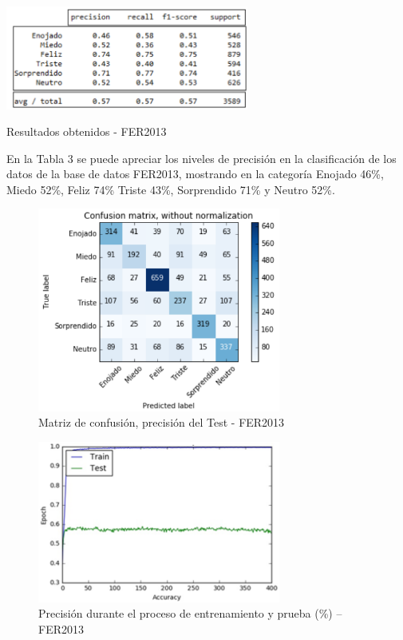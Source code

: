 \begin{table}[H]
    \centering
    \includegraphics[width=80mm]{./Imagenes/tabla_resultados_fer.png} 
    \caption{Resultados obtenidos - FER2013}
    \label{tab:tabla_resultados_fer}
\end{table}

En la Tabla 3 se puede apreciar los niveles de precisión en la clasificación de los
datos de la base de datos FER2013, mostrando en la categoría Enojado 46\%, Miedo 52\%,
Feliz 74\% Triste 43\%, Sorprendido 71\% y Neutro 52\%.

\begin{figure}[H]
		\centering
		\includegraphics[width=80mm]{./Imagenes/matriz_confusion_fer.png}
		\caption{Matriz de confusión, precisión del Test - FER2013}
		\label{fig:matriz_confusion_fer}
\end{figure}

\begin{figure}[H]
		\centering
		\includegraphics[width=80mm]{./Imagenes/precision_fer.png}
		\caption{Precisión durante el proceso de entrenamiento y prueba (\%) – FER2013}
		\label{fig:precision_fer}
\end{figure}

